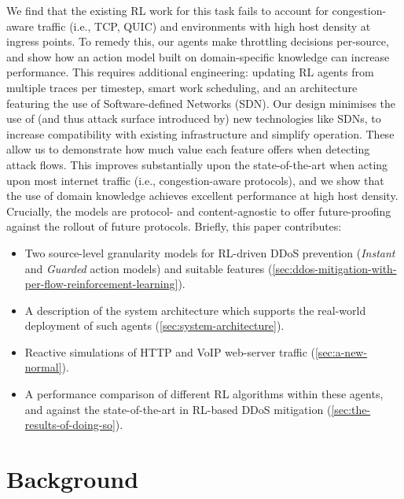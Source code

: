 \documentclass[10pt, times, conference, letterpaper]{IEEEtran}
\begin{document}
We find that the existing RL work for this task \cite{DBLP:journals/eaai/MalialisK15} fails to account for congestion-aware traffic (i.e., TCP, QUIC) and environments with high host density at ingress points.
To remedy this, our agents make throttling decisions per-source, and show how an action model built on domain-specific knowledge can increase performance.
This requires additional engineering: updating RL agents from multiple traces per timestep, smart work scheduling, and an architecture featuring the use of Software-defined Networks (SDN).
Our design minimises the use of (and thus attack surface introduced by) new technologies like SDNs, to increase compatibility with existing infrastructure and simplify operation.
These allow us to demonstrate how much value each feature offers when detecting attack flows.
This improves substantially upon the state-of-the-art when acting upon most internet traffic (i.e., congestion-aware protocols), and we show that the use of domain knowledge achieves excellent performance at high host density.
Crucially, the models are protocol- and content-agnostic to offer future-proofing against the rollout of future protocols.
Briefly, this paper contributes:
\begin{itemize}
	\item Two source-level granularity models for RL-driven DDoS prevention (\emph{Instant} and \emph{Guarded} action models) and suitable features (\cref{sec:ddos-mitigation-with-per-flow-reinforcement-learning}).
	\item A description of the system architecture which supports the real-world deployment of such agents (\cref{sec:system-architecture}).
	\item Reactive simulations of HTTP and VoIP web-server traffic (\cref{sec:a-new-normal}).
	\item A performance comparison of different RL algorithms within these agents, and against the state-of-the-art in RL-based DDoS mitigation (\cref{sec:the-results-of-doing-so}).
\end{itemize}

\section{Background}
\end{document}
